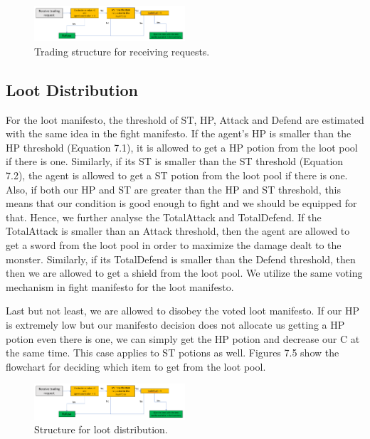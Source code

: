 \begin{figure}
    \centering
    \includegraphics[width=0.5\textwidth]{007_team_4_agent_design/figures/3_trading_receive_2.png}
    \caption{Trading structure for receiving requests.}
    \label{fig:proj_struct}
\end{figure}

\subsection{Loot Distribution}

\par For the loot manifesto, the threshold of ST, HP, Attack and Defend are estimated with the same idea in the fight manifesto. If the agent's HP is smaller than the HP threshold (Equation 7.1), it is allowed to get a HP potion from the loot pool if there is one. Similarly, if its ST is smaller than the ST threshold (Equation 7.2), the agent is allowed to get a ST potion from the loot pool if there is one. Also, if both our HP and ST are greater than the HP and ST threshold, this means that our condition is good enough to fight and we should be equipped for that. Hence, we further analyse the TotalAttack and TotalDefend. If the TotalAttack is smaller than an Attack threshold, then the agent are allowed to get a sword from the loot pool in order to maximize the damage dealt to the monster. Similarly, if its TotalDefend is smaller than the Defend threshold, then then we are allowed to get a shield from the loot pool. We utilize the same voting mechanism in fight manifesto for the loot manifesto.

\par Last but not least, we are allowed to disobey the voted loot manifesto. If our HP is extremely low but our manifesto decision does not allocate us  getting a HP potion even there is one, we can simply get the HP potion and decrease our C at the same time. This case applies to ST potions as well. Figures 7.5 show the flowchart for deciding which item to get from the loot pool.

\begin{figure}
    \centering
    \includegraphics[width=0.5\textwidth]{007_team_4_agent_design/figures/3_trading_receive_2.png}
    \caption{Structure for loot distribution.}
    \label{fig:proj_struct}
\end{figure}

